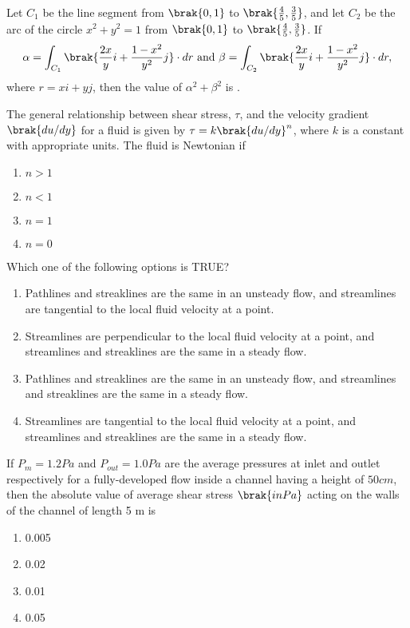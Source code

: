 \item Let $C_1$ be the line segment from $\brak{0,1}$ to $\brak{\frac{4}{5}, \frac{3}{5}}$, and let $C_2$ be the arc of the circle $x^2 + y^2 = 1$ from $\brak{0,1}$ to $\brak{\frac{4}{5}, \frac{3}{5}}$. If
$$\alpha = \int_{C_1} \brak{\frac{2x}{y}i + \frac{1-x^2}{y^2}j} \cdot dr \text{ and } \beta = \int_{C_2} \brak{\frac{2x}{y}i + \frac{1-x^2}{y^2}j} \cdot dr,$$
where $r = xi + yj$, then the value of $\alpha^2 + \beta^2$ is \underline{\hspace{1cm}}.
\item The general relationship between shear stress, $\tau$, and the velocity gradient $\brak{du/dy}$ for a fluid is given by $\tau = k\brak{du/dy}^n$, where $k$ is a constant with appropriate units. The fluid is Newtonian if
\begin{enumerate}
    \item $n > 1$
    \item $n < 1$
    \item $n = 1$
    \item $n = 0$
\end{enumerate}
\item Which one of the following options is TRUE?
\begin{enumerate}
    \item Pathlines and streaklines are the same in an unsteady flow, and streamlines are tangential to the local fluid velocity at a point.
    \item Streamlines are perpendicular to the local fluid velocity at a point, and streamlines and streaklines are the same in a steady flow.
    \item Pathlines and streaklines are the same in an unsteady flow, and streamlines and streaklines are the same in a steady flow.
    \item Streamlines are tangential to the local fluid velocity at a point, and streamlines and streaklines are the same in a steady flow.
    \end{enumerate}
\item If $P_m = 1.2 Pa$ and $P_{out} =1.0 Pa$ are the average pressures at inlet and outlet
respectively for a fully-developed flow inside a channel having a height of $50 cm$, then the absolute value of average shear stress $\brak{in Pa}$ acting on the walls of the channel of length 5 m is
\begin{enumerate}
    \item 0.005
    \item 0.02
    \item 0.01
    \item 0.05
\end{enumerate}
